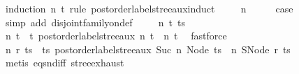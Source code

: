 \begin{isabellebody}
%
\isadelimproof
%
\endisadelimproof
%
\isatagproof
{}\isamarkupfalse%
\ {\isacharparenleft}{\kern0pt}induction\ n\ t\ rule{\isacharcolon}{\kern0pt}\ postorder{\isacharunderscore}{\kern0pt}label{\isacharunderscore}{\kern0pt}stree{\isacharunderscore}{\kern0pt}aux{\isachardot}{\kern0pt}induct{\isacharparenright}{\kern0pt}\isanewline
\ \ \isamarkupfalse%
\ {\isacharparenleft}{\kern0pt}{}\ n{\isacharparenright}{\kern0pt}\isanewline
\ \ \isamarkupfalse%
\ \isamarkupfalse%
\ {\isacharquery}{\kern0pt}case\ \isamarkupfalse%
\ {\isacharparenleft}{\kern0pt}simp\ add{\isacharcolon}{\kern0pt}\ disjoint{\isacharunderscore}{\kern0pt}family{\isacharunderscore}{\kern0pt}on{\isacharunderscore}{\kern0pt}def{\isacharparenright}{\kern0pt}\isanewline
{}\isamarkupfalse%
\isanewline
\ \ \isamarkupfalse%
\ {\isacharparenleft}{\kern0pt}{}\ n\ t\ ts{\isacharparenright}{\kern0pt}\isanewline
\ \ \isamarkupfalse%
\ n{\isacharprime}{\kern0pt}\ t{\isacharprime}{\kern0pt}\ \ t{\isacharprime}{\kern0pt}{\isacharcolon}{\kern0pt}\ {\isachardoublequoteopen}postorder{\isacharunderscore}{\kern0pt}label{\isacharunderscore}{\kern0pt}stree{\isacharunderscore}{\kern0pt}aux\ n\ t\ {\isacharequal}{\kern0pt}\ {\isacharparenleft}{\kern0pt}n{\isacharprime}{\kern0pt}{\isacharcomma}{\kern0pt}\ t{\isacharprime}{\kern0pt}{\isacharparenright}{\kern0pt}{\isachardoublequoteclose}\ \isamarkupfalse%
\ fastforce\isanewline
\ \ \isamarkupfalse%
\ n{\isacharprime}{\kern0pt}{\isacharprime}{\kern0pt}\ r\ ts{\isacharprime}{\kern0pt}\ \ ts{\isacharprime}{\kern0pt}{\isacharcolon}{\kern0pt}\ {\isachardoublequoteopen}postorder{\isacharunderscore}{\kern0pt}label{\isacharunderscore}{\kern0pt}stree{\isacharunderscore}{\kern0pt}aux\ {\isacharparenleft}{\kern0pt}Suc\ n{\isacharprime}{\kern0pt}{\isacharparenright}{\kern0pt}\ {\isacharparenleft}{\kern0pt}Node\ ts{\isacharparenright}{\kern0pt}\ {\isacharequal}{\kern0pt}\ {\isacharparenleft}{\kern0pt}n{\isacharprime}{\kern0pt}{\isacharprime}{\kern0pt}{\isacharcomma}{\kern0pt}\ SNode\ r\ ts{\isacharprime}{\kern0pt}{\isacharparenright}{\kern0pt}{\isachardoublequoteclose}\isanewline
\ \ \ \ \isamarkupfalse%
\ {\isacharparenleft}{\kern0pt}metis\ eq{\isacharunderscore}{\kern0pt}snd{\isacharunderscore}{\kern0pt}iff\ stree{\isachardot}{\kern0pt}exhaust{\isacharparenright}{\kern0pt}\isanewline
\ \ \isamarkupfalse%
\ \isamarkupfalse%

\end{isabellebody}
